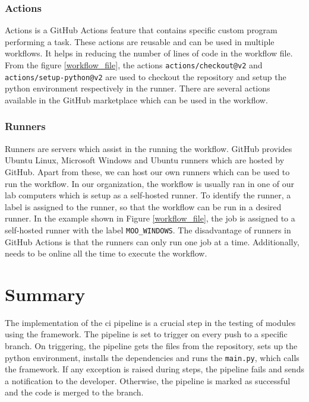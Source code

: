 \subsubsection{Actions}
Actions is a GitHub Actions feature that contains specific custom program performing a task. These actions are reusable and can be used in multiple workflows.
It helps in reducing the number of lines of code in the workflow file. From the figure \ref{workflow_file}, the actions \texttt{actions/checkout@v2} and 
\texttt{actions/setup-python@v2} are used to checkout the repository and setup the python environment respectively in the runner. There are several actions 
available in the GitHub marketplace which can be used in the workflow.

\subsubsection{Runners}
Runners are servers which assist in the running the workflow. GitHub provides Ubuntu Linux, Microsoft Windows and Ubuntu runners which are hosted by GitHub.
Apart from these, we can host our own runners which can be used to run the workflow. In our organization, the workflow is usually ran in one of our lab computers
which is setup as a self-hosted runner. To identify the runner, a label is assigned to the runner, so that the workflow can be run in a desired runner. 
In the example shown in Figure \ref{workflow_file}, the job is assigned to a self-hosted runner with the label \texttt{MOO\_WINDOWS}. The disadvantage of runners 
in GitHub Actions is that the runners can only run one job at a time. Additionally, needs to be online all the time to execute the workflow. 

\section{Summary}
The implementation of the \acrshort{ci} pipeline is a crucial step in the testing of modules using the framework. The pipeline is set to trigger on every push to
a specific branch. On triggering, the pipeline gets the files from the repository, sets up the python environment, installs the dependencies and runs the 
\texttt{main.py}, which calls the framework. If any exception is raised during steps, the pipeline fails and sends a notification to the developer. Otherwise,
the pipeline is marked as successful and the code is merged to the branch.